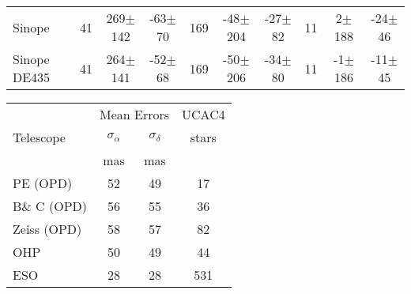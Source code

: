 \documentclass[11pt,a4paper]{report}
\begin{document}
\begin{landscape}
\begin{table*}
\begin{centering}
\begin{tabular}{l|ccc|ccc|ccc}
\hdashline
Sinope  & 41 & 269$\pm$142 & -63$\pm$ 70 & 169 & -48$\pm$204 & -27$\pm$ 82 & 11 &   2$\pm$188 & -24$\pm$ 46\tabularnewline
Sinope DE435 & 41 & 264$\pm$141 & -52$\pm$ 68 & 169 & -50$\pm$206 & -34$\pm$ 80 & 11 &  -1$\pm$186 & -11$\pm$ 45 \tabularnewline
\hline
\end{tabular}
\par \end{centering}
\end{table*}

\begin{table*}
\begin{centering}
\begin{tabular}{lccc}
\hline  \hline
 & \multicolumn{2}{c}{Mean Errors} & UCAC4 \tabularnewline
Telescope  & $\sigma_\alpha$ & $\sigma_\delta$ & stars\tabularnewline
 & mas & mas & \tabularnewline
\hline
PE (OPD) & 52 & 49 & 17 \\
B\& C (OPD) & 56 & 55 & 36 \\
Zeiss (OPD) & 58 & 57 & 82 \\
OHP & 50 & 49 & 44 \\
ESO & 28 & 28 & 531 \\
\hline
\end{tabular}
\par \end{centering}
\end{table*}



\end{landscape}
\end{document}
